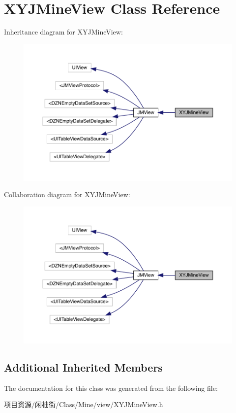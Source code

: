\hypertarget{interface_x_y_j_mine_view}{}\section{X\+Y\+J\+Mine\+View Class Reference}
\label{interface_x_y_j_mine_view}


Inheritance diagram for X\+Y\+J\+Mine\+View\+:\nopagebreak
\begin{figure}[H]
\begin{center}
\leavevmode
\includegraphics[width=350pt]{interface_x_y_j_mine_view__inherit__graph}
\end{center}
\end{figure}


Collaboration diagram for X\+Y\+J\+Mine\+View\+:\nopagebreak
\begin{figure}[H]
\begin{center}
\leavevmode
\includegraphics[width=350pt]{interface_x_y_j_mine_view__coll__graph}
\end{center}
\end{figure}
\subsection*{Additional Inherited Members}


The documentation for this class was generated from the following file\+:\begin{DoxyCompactItemize}
\item 
项目资源/闲柚街/\+Class/\+Mine/view/X\+Y\+J\+Mine\+View.\+h\end{DoxyCompactItemize}
